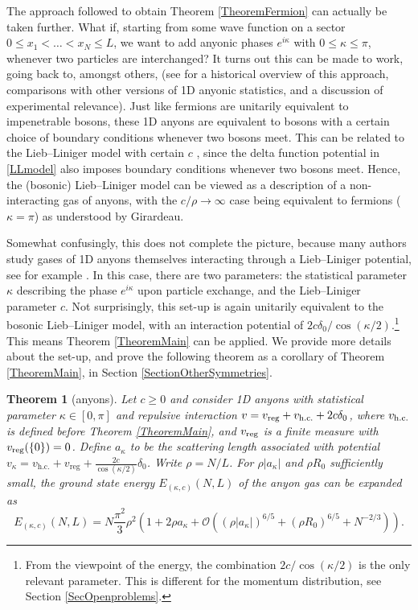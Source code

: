 \documentclass[a4paper,11pt]{article}
\newtheorem{theorem}{Theorem}
\numberwithin{equation}{section}
\begin{document}
The approach followed to obtain Theorem \ref{TheoremFermion} can actually be taken further. What if, starting from some wave function on a sector $0\leq x_1<\dots<x_N\leq L$, we want to add anyonic phases $e^{i\kappa}$ with $0\leq \kappa\leq\pi$, whenever two particles are interchanged? It turns out this can be made to work, going back to, amongst others,  \cite{leinaas1977theory,kundu1999exact} (see \cite{posske2017second,bonkhoff2021bosonic} for a historical overview of this approach, comparisons with other versions of 1D anyonic statistics, and a discussion of experimental relevance). Just like fermions are unitarily equivalent to impenetrable bosons, these 1D anyons are equivalent to bosons with a certain choice of boundary conditions whenever two bosons meet. This can be related to the Lieb--Liniger model with certain $c$ \cite{posske2017second}, since the delta function potential in \eqref{LLmodel} also imposes boundary conditions whenever two bosons meet. Hence, the (bosonic) Lieb--Liniger model can be viewed as a description of a non-interacting gas of anyons, with the $c/\rho\to\infty$ case being equivalent to fermions ($\kappa=\pi$) as understood by Girardeau. 

Somewhat confusingly, this does not complete the picture, because many authors study gases of 1D anyons themselves interacting through a Lieb--Liniger potential, see for example \cite{batchelor2006one,hao2008ground}. In this case, there are two parameters: the statistical parameter $\kappa$ describing the phase $e^{i\kappa}$ upon particle exchange, and the Lieb--Liniger parameter $c$. Not surprisingly, this set-up is again unitarily equivalent to the bosonic Lieb--Liniger model, with an interaction potential of $2c\delta_0/\cos(\kappa/2)$.\footnote{From the viewpoint of the energy, the combination $2c/\cos(\kappa/2)$ is the only relevant parameter. This is different for the momentum distribution, see Section \ref{SecOpenproblems}.} This means Theorem \ref{TheoremMain} can be applied. We provide more details about the set-up, and prove the following theorem as a corollary of Theorem \ref{TheoremMain}, in Section \ref{SectionOtherSymmetries}.



\begin{theorem}[anyons]
\label{TheoremAnyon}
Let $c\geq0$ and consider 1D anyons with statistical parameter $\kappa\in[0,\pi]$ and repulsive interaction $v=v_{\textnormal{reg}}+v_{\textnormal{h.c.}}+2c\delta_0$, where $v_{\textnormal{h.c.}}$ is defined before Theorem \ref{TheoremMain}, and $v_{\textnormal{reg}}$ is a finite measure with $v_{\textnormal{reg}}(\{0\})=0$.
Define $a_\kappa$ to be the scattering length associated with potential $ v_\kappa=v_{\text{h.c.}}+v_{\text{reg}}+\frac{2c}{\cos(\kappa/2)}\delta_0 $.
Write $\rho=N/L$. For $\rho|a_\kappa|$ and $\rho R_0$ sufficiently small, the ground state energy $E_{(\kappa,c)}(N,L)$ of the anyon gas can be expanded as
\begin{equation}
E_{(\kappa,c)}(N,L)=N\frac{\pi^2}{3}\rho^2\left(1+2\rho a_{\kappa}+\mathcal{O}
\left((\rho|a_\kappa|)^{6/5}+(\rho R_0)^{6/5}+N^{-2/3}\right)\right).
\end{equation}
\end{theorem}
\end{document}
